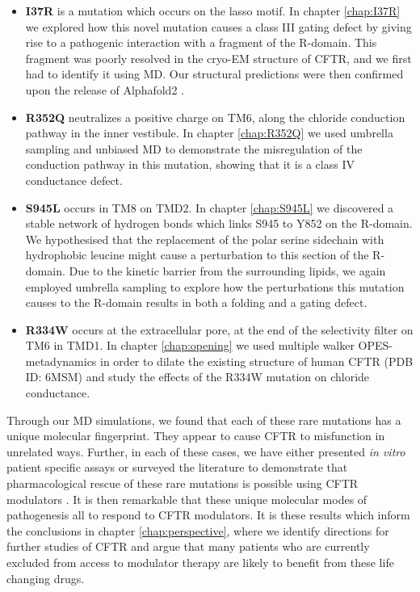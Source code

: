 \begin{itemize}
	\item \textbf{I37R} is a mutation which occurs on the lasso motif. In chapter \ref{chap:I37R} we explored how this novel mutation causes a class III gating defect by giving rise to a pathogenic interaction with a fragment of the R-domain. This fragment was poorly resolved in the cryo-EM structure of CFTR, and we first had to identify it using MD. Our structural predictions were then confirmed upon the release of Alphafold2 \cite{jumper2021}.  

	\item \textbf{R352Q} neutralizes a positive charge on TM6, along the chloride conduction pathway in the inner vestibule. In chapter \ref{chap:R352Q} we used umbrella sampling and unbiased MD to demonstrate the misregulation of the conduction pathway in this mutation, showing that it is a class IV conductance defect. 

	\item \textbf{S945L} occurs in TM8 on TMD2. In chapter \ref{chap:S945L} we discovered a stable network of hydrogen bonds which links S945 to Y852 on the R-domain. We hypothesised that the replacement of the polar serine sidechain with hydrophobic leucine might cause a perturbation to this section of the R-domain. Due to the kinetic barrier from the surrounding lipids, we again employed umbrella sampling to explore how the perturbations this mutation causes to the R-domain results in both a folding and a gating defect.

	\item \textbf {R334W} occurs at the extracellular pore, at the end of the selectivity filter on TM6 in TMD1. In chapter \ref{chap:opening} we used multiple walker OPES-metadynamics in order to dilate the existing structure of human CFTR (PDB ID: 6MSM) and study the effects of the R334W mutation on chloride conductance.

\end{itemize} 

Through our MD simulations, we found that each of these rare mutations has a unique molecular fingerprint. They appear to cause CFTR to misfunction in unrelated ways. Further, in each of these cases, we have either presented \textit{in vitro} patient specific assays or surveyed the literature to demonstrate that pharmacological rescue of these rare mutations is possible using CFTR modulators \cite{R334W_Euro_CF_trial}.  It is then remarkable that these unique molecular modes of pathogenesis all to respond to CFTR modulators. It is these results which inform the conclusions in chapter \ref{chap:perspective}, where we identify directions for further studies of CFTR and argue that many patients who are currently excluded from access to modulator therapy are likely to benefit from these life changing drugs. 

